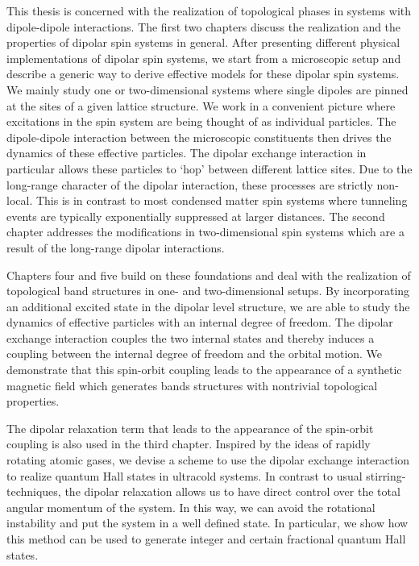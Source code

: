 This thesis is concerned with the realization of topological phases in systems with dipole-dipole interactions.
The first two chapters discuss the realization and the properties of dipolar spin systems in general.
After presenting different physical implementations of dipolar spin systems, we start from a microscopic setup and describe a generic way to derive effective models for these dipolar spin systems.
We mainly study one or two-dimensional systems where single dipoles are pinned at the sites of a given lattice structure.
We work in a convenient picture where excitations in the spin system are being thought of as individual particles.
The dipole-dipole interaction between the microscopic constituents then drives the dynamics of these effective particles.
The dipolar exchange interaction in particular allows these particles to `hop' between different lattice sites.
Due to the long-range character of the dipolar interaction, these processes are strictly non-local.
This is in contrast to most condensed matter spin systems where tunneling events are typically exponentially suppressed at larger distances.
The second chapter addresses the modifications in two-dimensional spin systems which are a result of the long-range dipolar interactions.

Chapters four and five build on these foundations and deal with the realization of topological band structures in one- and two-dimensional setups.
By incorporating an additional excited state in the dipolar level structure, we are able to study the dynamics of effective particles with an internal degree of freedom.
The dipolar exchange interaction couples the two internal states and thereby induces a coupling between the internal  degree of freedom and the orbital motion.
We demonstrate that this spin-orbit coupling leads to the appearance of a synthetic magnetic field which generates bands structures with nontrivial topological properties.

The dipolar relaxation term that leads to the appearance of the spin-orbit coupling is also used in the third chapter.
Inspired by the ideas of rapidly rotating atomic gases, we devise a scheme to use the dipolar exchange interaction to realize quantum Hall states in ultracold systems.
In contrast to usual stirring-techniques, the dipolar relaxation allows us to have direct control over the total angular momentum of the system.
In this way, we can avoid the rotational instability and put the system in a well defined state.
In particular, we show how this method can be used to generate integer and certain fractional quantum Hall states.

